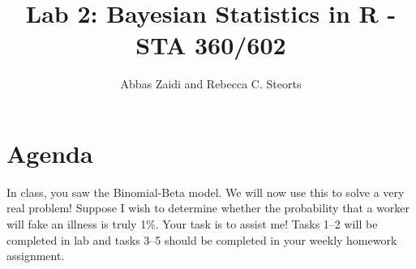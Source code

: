 \documentclass{article}
\begin{document}
\title{Lab 2: Bayesian Statistics in \textsf{R} - STA 360/602}
\author{Abbas Zaidi and Rebecca C. Steorts}
\date{}
\maketitle


\section{Agenda}

In class, you saw the Binomial-Beta model. We will now use this to solve a very real problem! Suppose I wish to determine whether the probability that a worker will fake an illness is truly 1\%. Your task is to assist me! Tasks 1--2 will be completed in lab and tasks 3--5 should be completed in your weekly homework assignment. 
\end{document}
